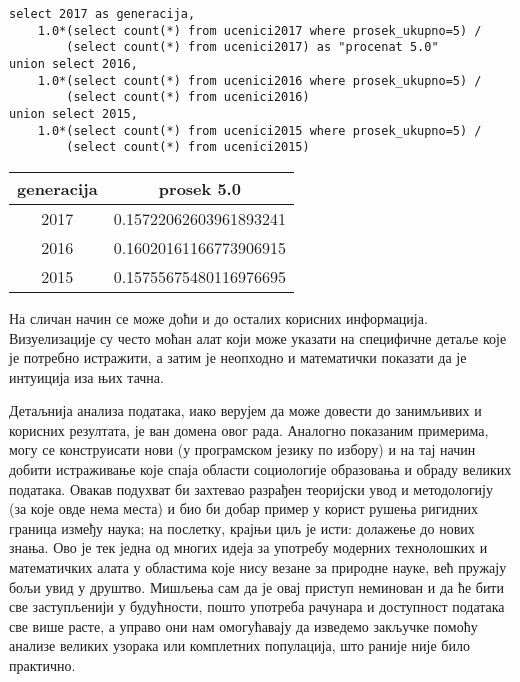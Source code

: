 \begin{verbatim}
select 2017 as generacija, 
    1.0*(select count(*) from ucenici2017 where prosek_ukupno=5) /
        (select count(*) from ucenici2017) as "procenat 5.0" 
union select 2016, 
    1.0*(select count(*) from ucenici2016 where prosek_ukupno=5) /
        (select count(*) from ucenici2016) 
union select 2015, 
    1.0*(select count(*) from ucenici2015 where prosek_ukupno=5) /
        (select count(*) from ucenici2015)
\end{verbatim}

\begin{tabular}{c|c}
generacija & prosek 5.0 \\ \hline
2017 & 0.15722062603961893241 \\
2016 & 0.16020161166773906915 \\
2015 & 0.15755675480116976695 \\
\end{tabular}

На сличан начин се може доћи и до осталих корисних информација. Визуелизације су често моћан алат који може указати на специфичне детаље које је потребно истражити, а затим је неопходно и математички показати да је интуиција иза њих тачна.

Детаљнија анализа података, иако верујем да може довести до занимљивих и корисних резултата, је ван домена овог рада. Аналогно показаним примерима, могу се конструисати нови (у програмском језику по избору) и на тај начин добити истраживање које спаја области социологије образовања и обраду великих података. Овакав подухват би захтевао разрађен теоријски увод и методологију (за које овде нема места) и био би добар пример у корист рушења ригидних граница између наука; на послетку, крајњи циљ је исти: долажење до нових знања. Ово је тек једна од многих идеја за употребу модерних технолошких и математичких алата у областима које нису везане за природне науке, већ пружају бољи увид у друштво. Мишљења сам да је овај приступ неминован и да ће бити све заступљенији у будућности, пошто употреба рачунара и доступност података све више расте, а управо они нам омогућавају да изведемо закључке помоћу анализе великих узорака или комплетних популација, што раније није било практично.